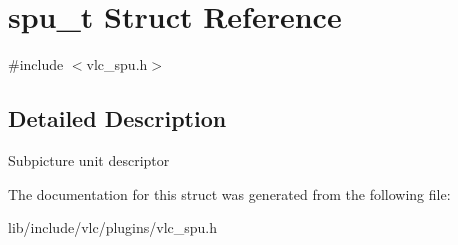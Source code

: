 \hypertarget{structspu__t}{}\section{spu\+\_\+t Struct Reference}
\label{structspu__t}


{\ttfamily \#include $<$vlc\+\_\+spu.\+h$>$}



\subsection{Detailed Description}
Subpicture unit descriptor 

The documentation for this struct was generated from the following file\+:\begin{DoxyCompactItemize}
\item 
lib/include/vlc/plugins/vlc\+\_\+spu.\+h\end{DoxyCompactItemize}
